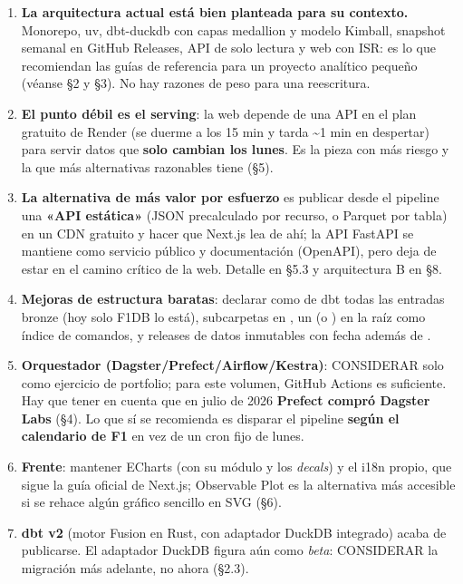 \begin{enumerate}
\item \textbf{La arquitectura actual está bien planteada para su contexto.} Monorepo, uv, dbt-duckdb con capas medallion y modelo Kimball, snapshot semanal en GitHub Releases, API de solo lectura y web con ISR: es lo que recomiendan las guías de referencia para un proyecto analítico pequeño (véanse §2 y §3). No hay razones de peso para una reescritura.
\item \textbf{El punto débil es el serving}: la web depende de una API en el plan gratuito de Render (se duerme a los 15 min y tarda \textasciitilde{}1 min en despertar) para servir datos que \textbf{solo cambian los lunes}. Es la pieza con más riesgo y la que más alternativas razonables tiene (§5).
\item \textbf{La alternativa de más valor por esfuerzo} es publicar desde el pipeline una \textbf{«API estática»} (JSON precalculado por recurso, o Parquet por tabla) en un CDN gratuito y hacer que Next.js lea de ahí; la API FastAPI se mantiene como servicio público y documentación (OpenAPI), pero deja de estar en el camino crítico de la web. Detalle en §5.3 y arquitectura B en §8.
\item \textbf{Mejoras de estructura baratas}: declarar como  de dbt todas las entradas bronze (hoy solo F1DB lo está), subcarpetas en , un  (o ) en la raíz como índice de comandos, y releases de datos inmutables con fecha además de .
\item \textbf{Orquestador (Dagster/Prefect/Airflow/Kestra)}: CONSIDERAR solo como ejercicio de portfolio; para este volumen, GitHub Actions es suficiente. Hay que tener en cuenta que en julio de 2026 \textbf{Prefect compró Dagster Labs} (§4). Lo que sí se recomienda es disparar el pipeline \textbf{según el calendario de F1} en vez de un cron fijo de lunes.
\item \textbf{Frente}: mantener ECharts (con su módulo  y los \emph{decals}) y el i18n propio, que sigue la guía oficial de Next.js; Observable Plot es la alternativa más accesible si se rehace algún gráfico sencillo en SVG (§6).
\item \textbf{dbt v2} (motor Fusion en Rust, con adaptador DuckDB integrado) acaba de publicarse. El adaptador DuckDB figura aún como \emph{beta}: CONSIDERAR la migración más adelante, no ahora (§2.3).
\end{enumerate}

